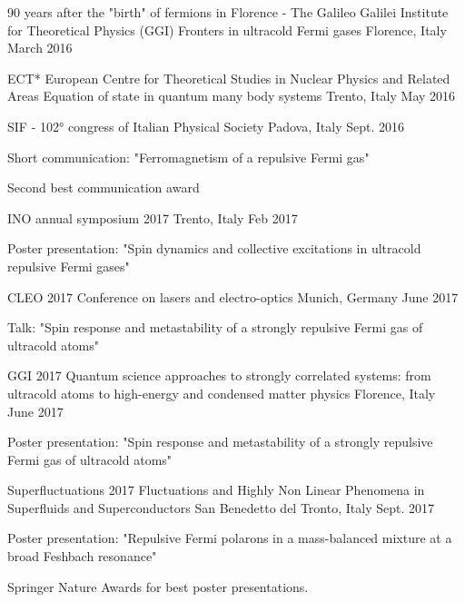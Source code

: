 \begin{cventries}
  \cventry
    {90 years after the "birth" of fermions in Florence - The Galileo Galilei Institute for Theoretical Physics (GGI)}
    {Fronters in ultracold Fermi gases}
    {Florence, Italy}
    {March 2016}
    {}
    
  \cventry
    {ECT*  European Centre for Theoretical Studies in Nuclear Physics and Related Areas}
    {Equation of state in quantum many body systems}
    {Trento, Italy}
    {May 2016}
    {}
    
    \cventry
    {}
    {SIF - 102° congress of Italian Physical Society}
    {Padova, Italy}
    {Sept. 2016}
    {
      \begin{cvitems}
        \item {Short communication: "Ferromagnetism of a repulsive Fermi gas"}
        \item {Second best communication award}
      \end{cvitems}
    }
    
    \cventry
    {}
    {INO annual symposium 2017}
    {Trento, Italy}
    {Feb 2017}
    {
      \begin{cvitems}
        \item {Poster presentation: "Spin dynamics and collective excitations in ultracold repulsive Fermi gases"}
      \end{cvitems}
    }
    
    \cventry
    {CLEO 2017}
    {Conference on lasers and electro-optics}
    {Munich, Germany}
    {June 2017}
    {
      \begin{cvitems}
        \item {Talk: "Spin response and metastability of a strongly repulsive Fermi gas of ultracold atoms"}
      \end{cvitems}
    }
    
    \cventry
    {GGI 2017}
    {Quantum science approaches to strongly correlated systems: from ultracold atoms to high-energy and condensed matter physics}
    {Florence, Italy}
    {June 2017}
    {
      \begin{cvitems}
        \item {Poster presentation: "Spin response and metastability of a strongly repulsive Fermi gas of ultracold atoms"}
      \end{cvitems}
    }

    \cventry
    {Superfluctuations 2017}
    {Fluctuations and Highly Non Linear Phenomena in Superfluids and Superconductors}
    {San Benedetto del Tronto, Italy}
    {Sept. 2017}
    {
      \begin{cvitems}
        \item {Poster presentation: "Repulsive Fermi polarons in a mass-balanced mixture at a broad Feshbach resonance"}
        \item {Springer Nature Awards for best poster presentations.}
      \end{cvitems}
    }
    

\end{cventries}
